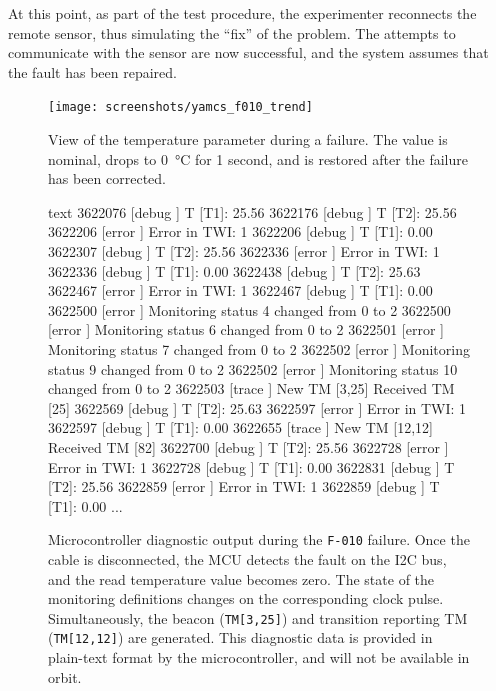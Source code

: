 \documentclass[a4paper,nobib]{tufte-book}
\begin{document}
At this point, as part of the test procedure, the experimenter reconnects the remote sensor, thus simulating the ``fix'' of the problem. The attempts to communicate with the sensor are now successful, and the system assumes that the fault has been repaired.
	
\begin{figure}[h]
		\centering
		\texttt{[image: screenshots/yamcs\_f010\_trend]}
		\caption[View of the temperature parameter during a failure]{View of the temperature parameter during a failure. The value is nominal, drops to \SI{0}{\celsius} for 1 second, and is restored after the failure has been corrected.}
		\label{fig:yamcsf010trend}
\end{figure}

\begin{figure}
	\begin{cminted}{text}
3622076 [debug  ] T [T1]: 25.56
3622176 [debug  ] T [T2]: 25.56
3622206 [error  ] Error in TWI: 1
3622206 [debug  ] T [T1]: 0.00
3622307 [debug  ] T [T2]: 25.56
3622336 [error  ] Error in TWI: 1
3622336 [debug  ] T [T1]: 0.00
3622438 [debug  ] T [T2]: 25.63
3622467 [error  ] Error in TWI: 1
3622467 [debug  ] T [T1]: 0.00
3622500 [error  ] Monitoring status 4 changed from 0 to 2
3622500 [error  ] Monitoring status 6 changed from 0 to 2
3622501 [error  ] Monitoring status 7 changed from 0 to 2
3622502 [error  ] Monitoring status 9 changed from 0 to 2
3622502 [error  ] Monitoring status 10 changed from 0 to 2
3622503 [trace  ] New TM [3,25]
Received TM [25]
3622569 [debug  ] T [T2]: 25.63
3622597 [error  ] Error in TWI: 1
3622597 [debug  ] T [T1]: 0.00
3622655 [trace  ] New TM [12,12]
Received TM [82]
3622700 [debug  ] T [T2]: 25.56
3622728 [error  ] Error in TWI: 1
3622728 [debug  ] T [T1]: 0.00
3622831 [debug  ] T [T2]: 25.56
3622859 [error  ] Error in TWI: 1
3622859 [debug  ] T [T1]: 0.00
...
	\end{cminted}
	\caption[Microcontroller diagnostic output during the \texttt{F-010} failure]{Microcontroller diagnostic output during the \texttt{F-010} failure. Once the cable is disconnected, the \acs{MCU} detects the fault on the \acs{I2C} bus, and the read temperature value becomes zero. The state of the monitoring definitions changes on the corresponding clock pulse. Simultaneously, the beacon (\texttt{TM[3,25]}) and transition reporting \acs{TM} (\texttt{TM[12,12]}) are generated. This diagnostic data is provided in plain-text format by the microcontroller, and will not be available in orbit.}
\end{figure}
\end{document}
